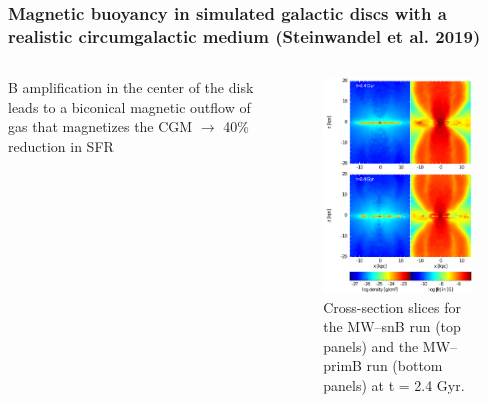 \documentclass[10pt,aspectratio=169]{beamer}
\begin{document}
\begin{frame}
	\frametitle{Magnetic buoyancy in simulated galactic discs with a realistic circumgalactic medium (Steinwandel et al. 2019)}
	\begin{columns}
		\begin{column}{0.52\textwidth}
				B amplification in the center of the disk leads to a biconical magnetic outflow of gas that magnetizes the CGM $\rightarrow$ 40\% reduction in SFR
		\end{column}
		\begin{column}{0.46\textwidth}
			\begin{figure}
				\includegraphics[width=4cm]{./images/outflow_complete.pdf}
				\caption{Cross-section slices for the MW–snB run (top panels) and the MW–primB run (bottom panels) at t = 2.4 Gyr.}
			\end{figure}
		\end{column}
	\end{columns}
\end{frame}
\end{document}
